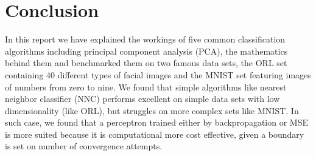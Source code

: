 \documentclass[journal]{IEEEtran}
\begin{document}
\section{Conclusion}

In this report we have explained the workings of five common classification algorithms including principal component analysis (PCA), the mathematics behind them and benchmarked them on two famous data sets, the ORL set containing 40 different types of facial images and the MNIST set featuring images of numbers from zero to nine. We found that simple algorithms like nearest neighbor classifier (NNC) performs excellent on simple data sets with low dimensionality (like ORL), but struggles on more complex sets like MNIST. In such case, we found that a perceptron trained either by backpropagation or MSE is more suited because it is computational more cost effective, given a boundary is set on number of convergence attempts.



\end{document}

